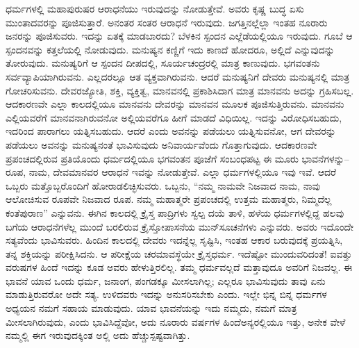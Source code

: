 ಧರ್ಮಗಳಲ್ಲಿ ಮಹಾಪುರುಷರ ಆರಾಧನೆಯು ಇರುವುದನ್ನು ನೋಡುತ್ತೇವೆ. ಅವರು ಕೃಷ್ಣ ಬುದ್ಧ ಏಸು ಮುಂತಾದವರನ್ನು ಪೂಜಿಸುತ್ತಾರೆ. ಅನಂತರ ಸಂತರ ಆರಾಧನೆ ಇರುವುದು. ಜಗತ್ತಿನಲ್ಲೆಲ್ಲಾ ಇಂತಹ ನೂರಾರು ಜನರನ್ನು ಪೂಜಿಸುವರು. ಇದನ್ನು ಏತಕ್ಕೆ ಮಾಡಬಾರದು? ಬೆಳಕಿನ ಸ್ಪಂದನ ಎಲ್ಲೆಡೆಯಲ್ಲಿಯೂ ಇರುವುದು. ಗೂಬೆ ಆ ಸ್ಪಂದನವನ್ನು ಕತ್ತಲೆಯಲ್ಲಿ ನೋಡುವುದು. ಮನುಷ್ಯನ ಕಣ್ಣಿಗೆ ಇದು ಕಾಣದೆ ಹೋದರೂ, ಅಲ್ಲಿದೆ ಎನ್ನುವುದನ್ನು ತೋರುವುದು. ಮನುಷ್ಯರಿಗೆ ಆ ಸ್ಪಂದನ ದೀಪದಲ್ಲಿ, ಸೂರ್ಯಚಂದ್ರರಲ್ಲಿ ಮಾತ್ರ ಕಾಣುವುದು. ಭಗವಂತನು ಸರ್ವವ್ಯಾಪಿಯಾಗಿರುವನು. ಎಲ್ಲದರಲ್ಲೂ ಆತ ವ್ಯಕ್ತವಾಗಿರುವನು. ಆದರೆ ಮನುಷ್ಯನಿಗೆ ದೇವರು ಮನುಷ್ಯನಲ್ಲಿ ಮಾತ್ರ ಗೋಚರಿಸುವನು. ದೇವರಜ್ಯೋತಿ, ಶಕ್ತಿ, ವ್ಯಕ್ತಿತ್ವ, ಮಾನವನಲ್ಲಿ ಪ್ರಕಾಶಿಸಿದಾಗ ಮಾತ್ರ ಮಾನವನು ಅದನ್ನು ಗ್ರಹಿಸಬಲ್ಲ. ಆದಕಾರಣವೇ ಎಲ್ಲಾ ಕಾಲದಲ್ಲಿಯೂ ಮಾನವನು ದೇವರನ್ನು ಮಾನವನ ಮೂಲಕ ಪೂಜಿಸುತ್ತಿರುವನು. ಮಾನವನು ಎಲ್ಲಿಯವರೆಗೆ ಮಾನವನಾಗಿರುವನೋ ಅಲ್ಲಿಯವರೆಗೂ ಹೀಗೆ ಮಾಡದೆ ವಿಧಿಯಿಲ್ಲ. ಇದನ್ನು ವಿರೋಧಿಸಬಹುದು, ಇದರಿಂದ ಪಾರಾಗಲು ಯತ್ನಿಸಬಹುದು. ಆದರೆ ಎಂದು ಅವನನ್ನು ಪಡೆಯಲು ಯತ್ನಿಸುವನೋ, ಆಗ ದೇವರನ್ನು ಪಡೆಯಲು ಅವನನ್ನು ಮನುಷ್ಯನಂತೆ ಭಾವಿಸುವುದು ಅನಿವಾರ್ಯವೆಂದು ಗೊತ್ತಾಗುವುದು. ಆದಕಾರಣವೇ ಪ್ರಪಂಚದಲ್ಲಿರುವ ಪ್ರತಿಯೊಂದು ಧರ್ಮದಲ್ಲಿಯೂ ಭಗವಂತನ ಪೂಜೆಗೆ ಸಂಬಂಧಪಟ್ಟ ಈ ಮೂರು ಭಾವನೆಗಳನ್ನು–ರೂಪ, ನಾಮ, ದೇವಮಾನವರ ಆರಾಧನೆ ಇವನ್ನು ನೋಡುತ್ತೇವೆ. ಎಲ್ಲಾ ಧರ್ಮಗಳಲ್ಲಿಯೂ ಇವು ಇವೆ. ಆದರೆ ಒಬ್ಬರು ಮತ್ತೊಬ್ಬರೊಂದಿಗೆ ಹೋರಾಡಲಿಚ್ಛಿಸುವರು. ಒಬ್ಬನು, “ನಮ್ಮ ನಾಮವೇ ನಿಜವಾದ ನಾಮ, ನಾವು ಆಲೋಚಿಸುವ ರೂಪವೇ ನಿಜವಾದ ರೂಪ. ನಮ್ಮ ಮಹಾತ್ಮರೇ ಪ್ರಪಂಚದಲ್ಲಿ ಉತ್ತಮ ಮಹಾತ್ಮರು, ನಿಮ್ಮದೆಲ್ಲ ಕಂತೆಪುರಾಣ” ಎನ್ನುವನು. ಈಗಿನ ಕಾಲದಲ್ಲಿ ಕ್ರೈಸ್ತ ಪಾದ್ರಿಗಳು ಸ್ವಲ್ಪ ದಯೆ ತಾಳಿ, ಹಳೆಯ ಧರ್ಮಗಳಲ್ಲಿದ್ದ ಹಲವು ಬಗೆಯ ಆರಾಧನೆಗಳೆಲ್ಲ ಮುಂದೆ ಬರಲಿರುವ ಕ್ರೈಸ್ತೋಪಾಸನೆಯ ಮುನ್​ಸೂಚನೆಗಳು ಎನ್ನುವರು. ಅವರು ಇದೊಂದೇ ಸತ್ಯವೆಂದು ಭಾವಿಸುವರು. ಹಿಂದಿನ ಕಾಲದಲ್ಲಿ ದೇವರು ಇದನ್ನೆಲ್ಲ ಸೃಷ್ಟಿಸಿ, ಇಂತಹ ಆಕಾರ ಬರುವುದಕ್ಕೆ ಪ್ರಯತ್ನಿಸಿ, ತನ್ನ ಶಕ್ತಿಯನ್ನು ಪರೀಕ್ಷಿಸಿದನು. ಆ ಪರೀಕ್ಷೆಯ ಚರಮಾವಸ್ಥೆಯೇ ಕ್ರೈಸ್ತಧರ್ಮ. ಇದೆಷ್ಟೋ ಮುಂದುವರಿದಂತೆ! ಐವತ್ತು ವರುಷ\-ಗಳ ಹಿಂದೆ ಇದನ್ನು ಕೂಡ ಅವರು ಹೇಳುತ್ತಿರಲಿಲ್ಲ. ತಮ್ಮ ಧರ್ಮವಲ್ಲದೆ ಮತ್ತಾವುದೂ ಅವರಿಗೆ ನಿಜವಲ್ಲ. ಈ ಭಾವನೆ ಯಾವ ಒಂದು ಧರ್ಮ, ಜನಾಂಗ, ಪಂಗಡಕ್ಕೂ ಮೀಸಲಾಗಿಲ್ಲ; ಎಲ್ಲರೂ ಭಾವಿಸುವುದು ತಾವು ಏನು ಮಾಡುತ್ತಿರುವರೋ ಅದೇ ಸತ್ಯ. ಉಳಿದವರು ಇದನ್ನು ಅನುಸರಿಸಬೇಕು ಎಂದು. ಇಲ್ಲೇ ಭಿನ್ನ ಬಿನ್ನ ಧರ್ಮಗಳ ಅಧ್ಯಯನ ನಮಗೆ ಸಹಾಯ ಮಾಡುವುದು. ಯಾವ ಭಾವನೆಯನ್ನು ಇದು ನಮ್ಮದು, ನಮಗೆ ಮಾತ್ರ ಮೀಸಲಾಗಿರುವುದು, ಎಂದು ಭಾವಿಸಿದ್ದೆವೋ, ಅದು ನೂರಾರು ವರ್ಷಗಳ ಹಿಂದೆ\break ಅನ್ಯರಲ್ಲಿಯೂ ಇತ್ತು, ಅನೇಕ ವೇಳೆ ನಮ್ಮಲ್ಲಿ ಈಗ ಇರುವುದಕ್ಕಿಂತ ಅಲ್ಲಿ ಅದು ಹೆಚ್ಚು\break ಸ್ಪಷ್ಟವಾಗಿತ್ತು.

